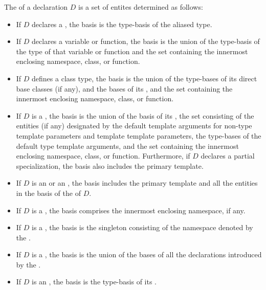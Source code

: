 \begin{std.txt}
\alinea
The  of a declaration $D$ is a set of entites determined as follows:
\begin{itemize}
\item If $D$ declares a , the basis is the
type-basis of the aliased type.

\item If $D$ declares a variable or function,
the basis is the union of
the type-basis of the type of that variable or function
and the set containing the
innermost enclosing namespace, class, or function.

\item If $D$ defines a class type, the basis is the union of the
type-bases of its direct base classes (if any), and the bases of
its ,
and the set containing the
innermost enclosing namespace, class, or function.

\item If $D$ is a ,
the basis is the union
of the basis of its , the set
consisting of
the entities (if any) designated by
the default template arguments for
non-type template parameters and template template parameters,
the type-bases of the default type template arguments,
and the set containing the
innermost enclosing namespace, class, or function.
Furthermore, if $D$ declares a partial specialization,
the basis also includes the primary template.

\item If $D$ is an 
or an , the basis includes
the primary template and all the entities in the basis of the
 of $D$.

\item If $D$ is a , the basis comprises
the innermost enclosing namespace, if any.

\item If $D$ is a , the basis is the 
singleton consisting of the namespace denoted by the
.

\item If $D$ is a , the basis is the union
of the bases of all the declarations introduced by
the .

\item If $D$ is an ,
the basis is the type-basis of its .


\end{itemize}
\end{std.txt}
